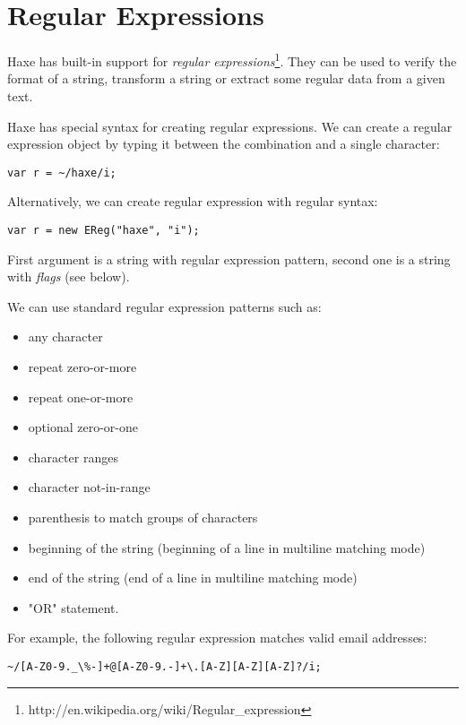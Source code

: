 \section{Regular Expressions}
\label{std-regex}

Haxe has built-in support for \emph{regular expressions}\footnote{http://en.wikipedia.org/wiki/Regular_expression}. They can be used to verify the format of a string, transform a string or extract some regular data from a given text.

Haxe has special syntax for creating regular expressions. We can create a regular expression object by typing it between the \expr{\textasciitilde/} combination and a single \expr{/} character:

\begin{lstlisting}
var r = ~/haxe/i;
\end{lstlisting}

Alternatively, we can create regular expression with regular syntax:

\begin{lstlisting}
var r = new EReg("haxe", "i");
\end{lstlisting}

First argument is a string with regular expression pattern, second one is a string with \emph{flags} (see below).

We can use standard regular expression patterns such as:
\begin{itemize}
	\item {} any character
	\item \expr{*} repeat zero-or-more
	\item \expr{+} repeat one-or-more
	\item {} optional zero-or-one
	\item \expr{[A-Z0-9]} character ranges
	\item {} character not-in-range
	\item {} parenthesis to match groups of characters
	\item \expr{\textasciicircum} beginning of the string (beginning of a line in multiline matching mode)
	\item \expr{\$} end of the string (end of a line in multiline matching mode)
	\item \expr{|} "OR" statement.
\end{itemize}

For example, the following regular expression matches valid email addresses:
\begin{lstlisting}
~/[A-Z0-9._\%-]+@[A-Z0-9.-]+\.[A-Z][A-Z][A-Z]?/i;
\end{lstlisting}

